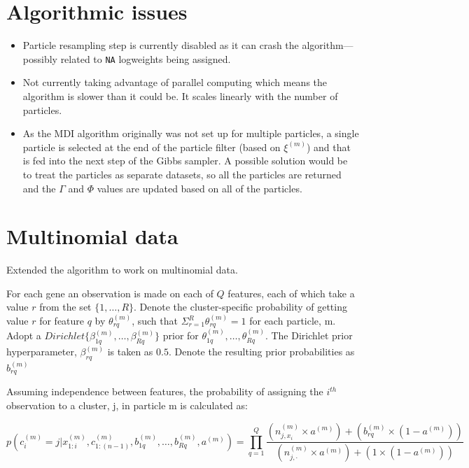 \documentclass[10pt,a4paper]{article}
\begin{document}
\section{Algorithmic issues}
\begin{itemize}
\item Particle resampling step is currently disabled as it can crash the algorithm---possibly related to \texttt{NA} logweights being assigned.
\item Not currently taking advantage of parallel computing which means the algorithm is slower than it could be. It scales linearly with the number of particles.
\item As the MDI algorithm originally was not set up for multiple particles, a single particle is selected at the end of the particle filter (based on $\xi^{(m)}$) and that is fed into the next step of the Gibbs sampler. A possible solution would be to treat the particles as separate datasets, so all the particles are returned and the $\Gamma$ and $\Phi$ values are updated based on all of the particles.
\end{itemize}


\section{Multinomial data}
Extended the algorithm to work on multinomial data.

For each gene an observation is made on each of $Q$ features, each of which take a value $r$ from the set $\{1, \dots, R\}$. Denote the cluster-specific probability of getting value $r$ for feature $q$ by $\theta_{rq}^{(m)}$, such that $\Sigma_{r = 1}^{R} \theta_{rq}^{(m)} = 1$ for each particle, m. Adopt a $Dirichlet\{\beta_{1q}^{(m)}, \dots, \beta_{Rq}^{(m)}\}$ prior for $\theta_{1q}^{(m)}, \dots, \theta_{Rq}^{(m)}$. The Dirichlet prior hyperparameter, $\beta_{rq}^{(m)}$ is taken as $0.5$. Denote the resulting prior probabilities as $b_{rq}^{(m)}$

Assuming independence between features, the probability of assigning the $i^{th}$ observation to a cluster, j, in particle m is calculated as:

\begin{equation}
p(c_{i}^{(m)} = j| x_{1:i}^{(m)}, c_{1:(n - 1)}^{(m)},b_{1q}^{(m)}, \dots, b_{Rq}^{(m)}, a^{(m)} ) = 
\prod_{q = 1}^{Q} 
\frac{(n_{j, x_i}^{(m)} \times a^{(m)}) + (b_{rq}^{(m)} \times (1 - a^{(m)}))}
{(n_{j, \cdot}^{(m)} \times a^{(m)}) + (1 \times (1 - a^{(m)}))}
\end{equation}
\end{document}
